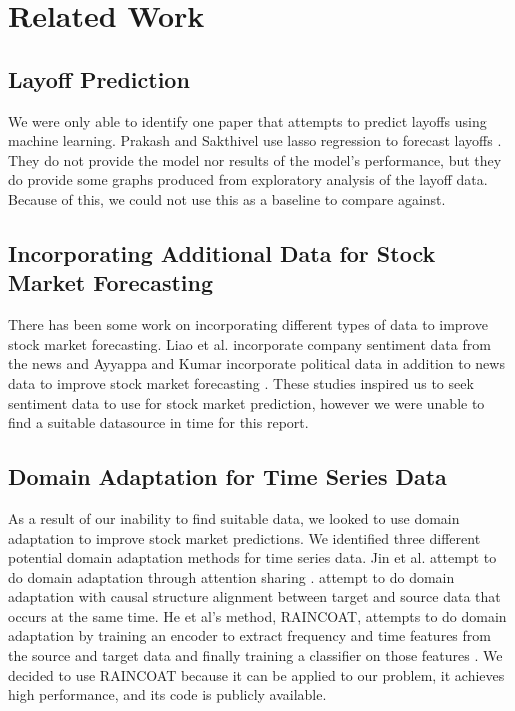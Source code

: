 \documentclass[10pt]{article}
\begin{document}
%
% 

\section{Related Work}

\subsection{Layoff Prediction}
We were only able to identify one paper that attempts to predict layoffs 
using machine learning. Prakash and Sakthivel use lasso regression 
to forecast layoffs \cite{predicting-layoffs}. They do not provide the model nor results of the 
model's performance, but they do provide some graphs produced from 
exploratory analysis of the layoff data. Because of this, we could not 
use this as a baseline to compare against. 

\subsection{Incorporating Additional Data for Stock Market Forecasting}
There has been some work on incorporating different types of data to 
improve stock market forecasting.  
Liao et al. incorporate company sentiment data from the news \cite{sentiment-analysis-in-stocks} and 
Ayyappa and Kumar incorporate political data in 
addition to news data to improve stock market forecasting \cite{stocks-news-politics-for-stocks}. 
These studies inspired us to seek sentiment data to use for stock 
market prediction, however we were unable to find a suitable datasource 
in time for this report. 

\subsection{Domain Adaptation for Time Series Data}
As a result of our inability to find suitable data, we looked to use 
domain adaptation to improve stock market predictions. We identified 
three different potential domain adaptation methods for time series 
data. Jin et al. attempt to do domain 
adaptation through attention sharing \cite{domain-adaptation-attention-sharing}. \cite{domain-adaptation-structure-alignment} 
attempt to do domain adaptation with causal structure alignment 
between target and source data that occurs at the same time. 
He et al's method, RAINCOAT, attempts to do domain adaptation 
by training an encoder to extract frequency and time features from 
the source and target data and finally training a classifier on those 
features \cite{raincoat}. We decided to use RAINCOAT because it can be applied to our 
problem, it achieves high performance, and its code is publicly 
available.
\end{document}
